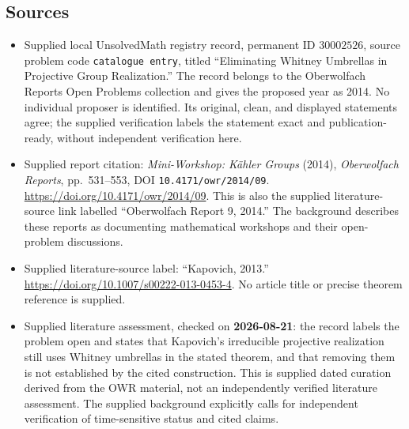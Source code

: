 \documentclass[11pt]{article}
\begin{document}
\subsection{Sources}
\begin{itemize}
\item Supplied local UnsolvedMath registry record, permanent ID \(30002526\), source problem code \texttt{catalogue entry}, titled ``Eliminating Whitney Umbrellas in Projective Group Realization.'' The record belongs to the Oberwolfach Reports Open Problems collection and gives the proposed year as 2014. No individual proposer is identified. Its original, clean, and displayed statements agree; the supplied verification labels the statement exact and publication-ready, without independent verification here.
\item Supplied report citation: \emph{Mini-Workshop: Kähler Groups} (2014), \emph{Oberwolfach Reports}, pp.\ 531--553, DOI \texttt{10.4171/owr/2014/09}. \url{https://doi.org/10.4171/owr/2014/09}. This is also the supplied literature-source link labelled ``Oberwolfach Report 9, 2014.'' The background describes these reports as documenting mathematical workshops and their open-problem discussions.
\item Supplied literature-source label: ``Kapovich, 2013.'' \url{https://doi.org/10.1007/s00222-013-0453-4}. No article title or precise theorem reference is supplied.
\item Supplied literature assessment, checked on \textbf{2026-08-21}: the record labels the problem open and states that Kapovich's irreducible projective realization still uses Whitney umbrellas in the stated theorem, and that removing them is not established by the cited construction. This is supplied dated curation derived from the OWR material, not an independently verified literature assessment. The supplied background explicitly calls for independent verification of time-sensitive status and cited claims.
\end{itemize}
\end{document}
